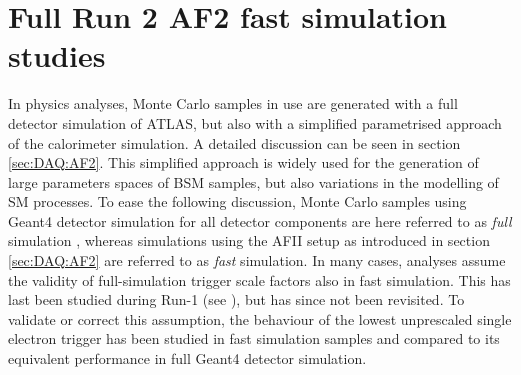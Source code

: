 %

\section{Full Run 2 AF2 fast simulation studies}
\label{sec:trigg:fastsimPerformance}
In physics analyses,  Monte Carlo samples in use are generated with a full detector simulation of ATLAS,  but also with a simplified parametrised approach of the calorimeter simulation.  A detailed discussion can be seen in section \ref{sec:DAQ:AF2}.  This simplified approach is widely used for the generation of large parameters spaces of \ac{BSM} samples,  but also variations in the modelling of \ac{SM}  processes. 
To ease the following discussion,  Monte Carlo samples using Geant4 detector simulation for all detector components are here referred to as \textit{full} simulation , whereas simulations using the AFII setup as introduced in section \ref{sec:DAQ:AF2} are referred to as \textit{fast} simulation.
In many cases,  analyses assume the validity of full-simulation trigger scale factors also in fast simulation.  This has last been studied during Run-1 (see \cite{AFIIprinciple}),  but has since not been revisited. 
To validate or correct this assumption,  the behaviour of the lowest unprescaled single electron trigger has been studied in fast simulation samples and compared to its equivalent performance in full Geant4 detector simulation.  


